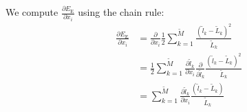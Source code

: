 \documentclass{article}
\newcommand{\EE}{\ensuremath{E_\mathrm{E}}\xspace}
\begin{document}

We compute $\frac{\partial\EE}{\partial x_i}$ using the chain rule:
\begin{equation}
  \label{retistruct-algorithm:eq:7}
  \begin{split}
    \frac{\partial\EE}{\partial x_i} & = \frac{\partial}{\partial x_i}
    \frac{1}{2} \sum_{k=1}^{\tilde M} \frac{(\tilde l_k- \tilde
      L_k)^2}{\tilde L_k} \\
    & = 
    \frac{1}{2} \sum_{k=1}^{\tilde M} \frac{\partial \tilde l_k}{\partial
      x_i} \frac{\partial }{\partial \tilde l_k}\frac{(\tilde l_k- \tilde
      L_k)^2}{\tilde L_k} \\
       & = 
       \sum_{k=1}^{\tilde M} \frac{\partial \tilde l_k}{\partial
      x_i} \frac{(\tilde l_k- \tilde
      L_k)}{\tilde L_k}
  \end{split}
\end{equation}
\end{document}
